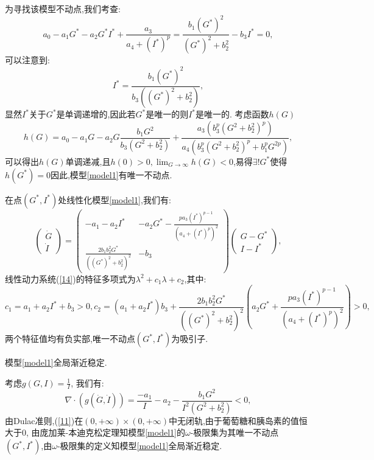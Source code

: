 \begin{pf}
    为寻找该模型不动点,我们考查:
    \begin{equation}
        a_0-a_1G^*-a_2G^*I^*+\frac{a_3}{a_4+(I^*)^p}= \frac{b_1 (G^*)^2}{(G^*)^2 + b_2^2} - b_3 I^*=0,
    \end{equation}
    可以注意到:
    \begin{equation}
        I^*=\frac{b_1 (G^*)^2}{b_3((G^*)^2 + b_2^2)},
    \end{equation}
    显然$I^*$关于$G^*$是单调递增的,因此若$G^*$是唯一的则$I^*$是唯一的. 考虑函数$h(G)$
    \begin{equation}
        h(G)=a_0-a_1G-a_2G\frac{b_1G^2}{b_3(G^2+b_2^2)}+\frac{a_3(b_3^p(G^2+b_2^2)^p)}{a_4(b_3^p(G^2+b_2^2)^p+b_1^pG^{2p})},
    \end{equation}
    可以得出$h(G)$单调递减,且$h(0)>0,\lim_{G\to\infty}h(G)<0$,易得$\exists !G^*$使得$h(G^*)=0$因此,模型\ref{model1}有唯一不动点. 

    在点$(G^*,I^*)$处线性化模型\ref{model1},我们有:
    \begin{equation}\label{14}
        \begin{pmatrix}
            \dot{G} \\
            \dot{I}
        \end{pmatrix}=\begin{pmatrix}
            -a_1-a_2I^*                              & -a_2G^*-\frac{pa_3(I^*)^{p-1}}{(a_4+(I^*)^p)^2} \\
            \frac{2b_1b_2^2G^*}{((G^*)^2 + b_2^2)^2} & -b_3
        \end{pmatrix}\begin{pmatrix}
            G-G^* \\
            I-I^*
        \end{pmatrix},
    \end{equation}
    线性动力系统(\ref{14})的特征多项式为$\lambda^2+c_1\lambda+c_2$,其中:
    \begin{equation*}
        c_1=a_1+a_2I^*+b_3>0, c_2=(a_1+a_2I^*)b_3+\frac{2b_1b_2^2G^*}{((G^*)^2 + b_2^2)^2}(a_2G^*+\frac{pa_3(I^*)^{p-1}}{(a_4+(I^*)^p)^2})>0,
    \end{equation*}
    两个特征值均有负实部,唯一不动点$(G^*,I^*)$为吸引子\cite{strogatz2018nonlinear}. 

\end{pf}
\begin{prop}\label{prop2}
    模型\ref{model1}全局渐近稳定. 
\end{prop}
\begin{pf}
    考虑$g(G,I)=\frac{1}{I}$, 我们有:
    \begin{equation}
        \nabla\cdot(g(\dot{G},\dot{I}))=\frac{-a_1}{I}-a_2-\frac{b_1 G^2}{I^2(G^2 + b_2^2)}<0,
    \end{equation}
    由Dulac准则,(\ref{11})在$(0,+\infty)\times (0,+\infty)$中无闭轨,由于葡萄糖和胰岛素的值恒大于$0$, 由庞加莱-本迪克松定理知模型\ref{model1}的$\omega$-极限集为其唯一不动点$(G^*,I^*)$,由$\omega$-极限集的定义知模型\ref{model1}全局渐近稳定. 
\end{pf}

